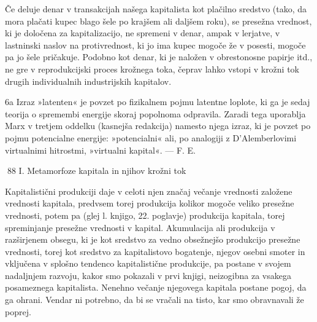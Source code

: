 \documentclass[kapital_02.tex]{subfiles}
\begin{document}
Če deluje denar v transakcijah našega kapitalista kot plačilno sredstvo (tako, da mora plačati kupec blago šele po krajšem ali daljšem roku), se presežna vrednost, ki je določena za kapitalizacijo, ne spremeni v denar, ampak v lerjatve, v lastninski naslov na protivrednost, ki jo ima kupec mogoče že v posesti, mogoče pa jo šele pričakuje. Podobno kot denar, ki je naložen v obrestonosne papirje itd., ne gre v reprodukcijski proces krožnega toka, čeprav lahko vstopi v krožni tok drugih individualnih industrijskih kapitalov.



 6a Izraz »latenten« je povzet po fizikalnem pojmu latentne loplote, ki ga je sedaj teorija o spremembi energije skoraj popolnoma odpravila. Zaradi tega uporablja Marx v tretjem oddelku (kasnejša redakcija) namesto njega izraz, ki je povzet po pojmu potencialne energije: »potencialni« ali, po analogiji z D'Alemberlovimi virtualnimi hitrostmi, »virtualni kapital«. — F. E.



88 I. Metamorfoze kapitala in njihov krožni tok



 Kapitalistični produkciji daje v celoti njen značaj večanje vrednosti založene vrednosti kapitala, predvsem torej produkcija kolikor mogoče veliko presežne vrednosti, potem pa (glej l. knjigo, 22. poglavje) produkcija kapitala, torej spreminjanje presežne vrednosti v kapital. Akumulacija ali produkcija v razširjenem obsegu, ki je kot sredstvo za vedno obsežnejšo produkcijo presežne vrednosti, torej kot sredstvo za kapitalistovo bogatenje, njegov osebni smoter in vključena v splošno tendenco kapitalistične produkcije, pa postane v svojem nadaljnjem razvoju, kakor smo pokazali v prvi knjigi, neizogibna za vsakega posameznega kapitalista. Nenehno večanje njegovega kapitala postane pogoj, da ga ohrani. Vendar ni potrebno, da bi se vračali na tisto, kar smo obravnavali že poprej.
\end{document}
